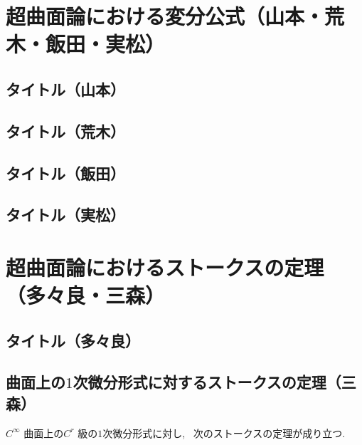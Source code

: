 \documentclass[12pt,a4j,final]{jreport}
\theoremstyle{definition}
\begin{document}
\chapter{超曲面論における変分公式（山本・荒木・飯田・実松）}\label{chap:conclusion}

\section{タイトル（山本）}



\section{タイトル（荒木）}



\section{タイトル（飯田）}





\section{タイトル（実松）}





\chapter{超曲面論におけるストークスの定理（多々良・三森）}


\section{タイトル（多々良）}



\section{曲面上の$1$次微分形式に対するストークスの定理（三森）}

$C^{\infty}$ 曲面上の$C^r$ 級の$1$次微分形式に対し, \ 次のストークスの定理が成り立つ.
\end{document}
